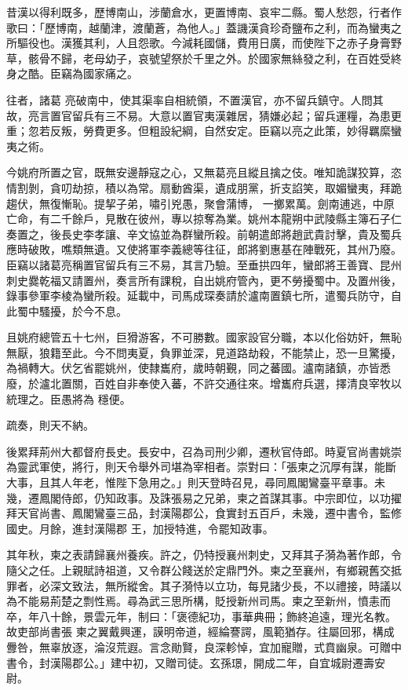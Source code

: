 \begin{pinyinscope}
 昔漢以得利既多，歷博南山，涉蘭倉水，更置博南、哀牢二縣。蜀人愁怨，行者作歌曰：「歷博南，越蘭津，渡蘭蒼，為他人。」蓋譏漢貪珍奇鹽布之利，而為蠻夷之所驅役也。漢獲其利，人且怨歌。今減耗國儲，費用日廣，而使陛下之赤子身膏野草，骸骨不歸，老母幼子，哀號望祭於千里之外。於國家無絲發之利，在百姓受終身之酷。臣竊為國家痛之。



 往者，諸葛
 亮破南中，使其渠率自相統領，不置漢官，亦不留兵鎮守。人問其故，亮言置官留兵有三不易。大意以置官夷漢雜居，猜嫌必起；留兵運糧，為患更重；忽若反叛，勞費更多。但粗設紀綱，自然安定。臣竊以亮之此策，妙得羈縻蠻夷之術。



 今姚府所置之官，既無安邊靜寇之心，又無葛亮且縱且擒之伎。唯知詭謀狡算，恣情割剝，貪叨劫掠，積以為常。扇動酋渠，遺成朋黨，折支諂笑，取媚蠻夷，拜跪趨伏，無復慚恥。提挈子弟，嘯引兇愚，聚會蒲博，
 一擲累萬。劍南逋逃，中原亡命，有二千餘戶，見散在彼州，專以掠奪為業。姚州本龍朔中武陵縣主簿石子仁奏置之，後長史李孝讓、辛文協並為群蠻所殺。前朝遣郎將趙武貴討擊，貴及蜀兵應時破敗，噍類無遺。又使將軍李義總等往征，郎將劉惠基在陣戰死，其州乃廢。臣竊以諸葛亮稱置官留兵有三不易，其言乃驗。至垂拱四年，蠻郎將王善寶、昆州刺史爨乾福又請置州，奏言所有課稅，自出姚府管內，更不勞擾蜀中。及置州後，
 錄事參軍李棱為蠻所殺。延載中，司馬成琛奏請於瀘南置鎮七所，遣蜀兵防守，自此蜀中騷擾，於今不息。



 且姚府總管五十七州，巨猾游客，不可勝數。國家設官分職，本以化俗妨奸，無恥無厭，狼籍至此。今不問夷夏，負罪並深，見道路劫殺，不能禁止，恐一旦驚擾，為禍轉大。伏乞省罷姚州，使隸巂府，歲時朝覲，同之蕃國。瀘南諸鎮，亦皆悉廢，於瀘北置關，百姓自非奉使入蕃，不許交通往來。增巂府兵選，擇清良宰牧以統理之。臣愚將為
 穩便。



 疏奏，則天不納。



 後累拜荊州大都督府長史。長安中，召為司刑少卿，遷秋官侍郎。時夏官尚書姚崇為靈武軍使，將行，則天令舉外司堪為宰相者。崇對曰：「張柬之沉厚有謀，能斷大事，且其人年老，惟陛下急用之。」則天登時召見，尋同鳳閣鸞臺平章事。未幾，遷鳳閣侍郎，仍知政事。及誅張易之兄弟，柬之首謀其事。中宗即位，以功擢拜天官尚書、鳳閣鸞臺三品，封漢陽郡公，食實封五百戶，未幾，遷中書令，監修國史。月餘，進封漢陽郡
 王，加授特進，令罷知政事。



 其年秋，柬之表請歸襄州養疾。許之，仍特授襄州刺史，又拜其子漪為著作郎，令隨父之任。上親賦詩祖道，又令群公餞送於定鼎門外。柬之至襄州，有鄉親舊交抵罪者，必深文致法，無所縱舍。其子漪恃以立功，每見諸少長，不以禮接，時議以為不能易荊楚之剽性焉。尋為武三思所構，貶授新州司馬。柬之至新州，憤恚而卒，年八十餘，景雲元年，制曰：「褒德紀功，事華典冊；飾終追遠，理光名教。故吏部尚書張
 柬之翼戴興運，謨明帝道，經綸謇諤，風範猶存。往屬回邪，構成釁咎，無辜放逐，淪沒荒遐。言念勛賢，良深軫悼，宜加寵贈，式賁幽泉。可贈中書令，封漢陽郡公。」建中初，又贈司徒。玄孫璟，開成二年，自宜城尉遷壽安尉。




\end{pinyinscope}
